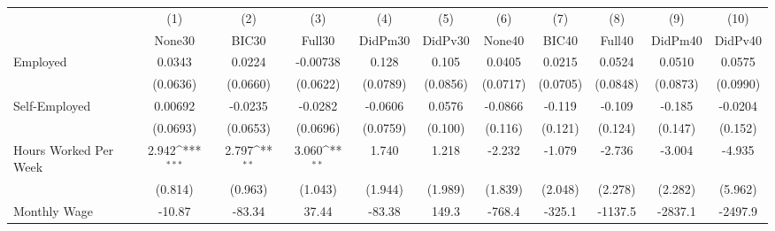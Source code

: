 {
\def\sym#1{\ifmmode^{#1}\else\(^{#1}\)\fi}
\begin{tabular}{l*{10}{c}}
\toprule
            &\multicolumn{1}{c}{(1)}&\multicolumn{1}{c}{(2)}&\multicolumn{1}{c}{(3)}&\multicolumn{1}{c}{(4)}&\multicolumn{1}{c}{(5)}&\multicolumn{1}{c}{(6)}&\multicolumn{1}{c}{(7)}&\multicolumn{1}{c}{(8)}&\multicolumn{1}{c}{(9)}&\multicolumn{1}{c}{(10)}\\
            &\multicolumn{1}{c}{None30}&\multicolumn{1}{c}{BIC30}&\multicolumn{1}{c}{Full30}&\multicolumn{1}{c}{DidPm30}&\multicolumn{1}{c}{DidPv30}&\multicolumn{1}{c}{None40}&\multicolumn{1}{c}{BIC40}&\multicolumn{1}{c}{Full40}&\multicolumn{1}{c}{DidPm40}&\multicolumn{1}{c}{DidPv40}\\
\midrule
Employed    &      0.0343         &      0.0224         &    -0.00738         &       0.128         &       0.105         &      0.0405         &      0.0215         &      0.0524         &      0.0510         &      0.0575         \\
            &    (0.0636)         &    (0.0660)         &    (0.0622)         &    (0.0789)         &    (0.0856)         &    (0.0717)         &    (0.0705)         &    (0.0848)         &    (0.0873)         &    (0.0990)         \\
\addlinespace
Self-Employed&     0.00692         &     -0.0235         &     -0.0282         &     -0.0606         &      0.0576         &     -0.0866         &      -0.119         &      -0.109         &      -0.185         &     -0.0204         \\
            &    (0.0693)         &    (0.0653)         &    (0.0696)         &    (0.0759)         &     (0.100)         &     (0.116)         &     (0.121)         &     (0.124)         &     (0.147)         &     (0.152)         \\
\addlinespace
Hours Worked Per Week&       2.942\sym{***}&       2.797\sym{**} &       3.060\sym{**} &       1.740         &       1.218         &      -2.232         &      -1.079         &      -2.736         &      -3.004         &      -4.935         \\
            &     (0.814)         &     (0.963)         &     (1.043)         &     (1.944)         &     (1.989)         &     (1.839)         &     (2.048)         &     (2.278)         &     (2.282)         &     (5.962)         \\
\addlinespace
Monthly Wage&      -10.87         &      -83.34         &       37.44         &      -83.38         &       149.3         &      -768.4         &      -325.1         &     -1137.5         &     -2837.1         &     -2497.9         \\

\end{tabular}}
